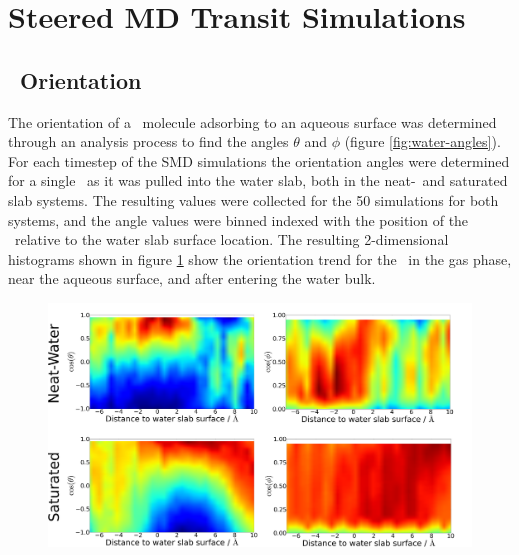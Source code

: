 \section{Steered MD Transit Simulations}

\subsection {\suldiox~Orientation}

	The orientation of a \suldiox~molecule adsorbing to an aqueous surface was determined through an analysis process to find the angles $\theta$ and $\phi$ (figure \ref{fig:water-angles}). For each timestep of the SMD simulations the orientation angles were determined for a single \suldiox~as it was pulled into the water slab, both in the neat-\wat~and saturated slab systems. The resulting values were collected for the 50 simulations for both systems, and the angle values were binned indexed with the position of the \suldiox~relative to the water slab surface location. The resulting 2-dimensional histograms shown in figure \ref{fig:so2-transit-angles} show the orientation trend for the \suldiox~in the gas phase, near the aqueous surface, and after entering the water bulk.

\begin{figure}[h!]
	\begin{center}
		\includegraphics[scale=1.0]{images/so2-angles/so2-angles-transit.png}
		\caption{}
		\label{fig:so2-transit-angles}
	\end{center}
\end{figure}


